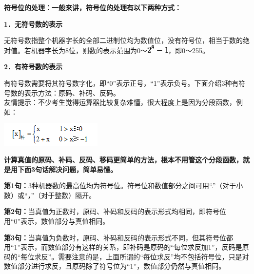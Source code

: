 \textbf{符号位的处理：一般来讲，符号位的处理有以下两种方式：}

\textbf{1．无符号数的表示}

无符号数指整个机器字长的全部二进制位均为数值位，没有符号位，相当于数的绝对值。若机器字长为8位，则数的表示范围为0～\includegraphics[width=0.44792in,height=0.16667in]{texmath/b4598028-1}，即0～255。

\textbf{2．有符号数的表示}

有符号数需要将其符号数字化，即``0''表示正号，``1''表示负号。下面介绍3种有符号数的表示方法：原码、补码、反码。\\

友情提示：不少考生觉得运算器比较复杂难懂，很大程度上是因为分段函数，例如：

\includegraphics[width=2.00000in,height=0.47917in]{png-jpeg-pics/74926997B7159E2348695202D4DC1894.png}

\textbf{{计算真值的原码、补码、反码、移码更简单的方法，根本不用管这个分段函数，就是用下面3句话解决问题，简单易懂。}}

\textbf{第1句：}3种机器数的最高位均为符号位。符号位和数值部分之间可用``.''（对于小数）或``，''（对于整数）隔开。

\textbf{第2句：}当真值为正数时，原码、补码和反码的表示形式均相同，即符号位用``0''表示，数值部分与真值相同。

\textbf{第3句：}当真值为负数时，原码、补码和反码的表示形式不同，但其符号位都用``1''表示，而数值部分有这样的关系，即补码是原码的``每位求反加1''，反码是原码的``每位求反''。需要注意的是，上面所谓的``每位求反''均不包括符号位，只是对数值部分进行求反，且原码除了符号位为``1''，数值部分仍然与真值相同。
